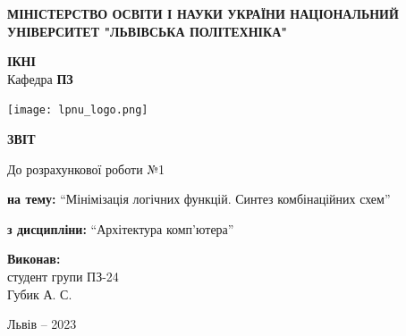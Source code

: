 \documentclass[12pt]{extarticle}
\begin{document}
\begin{titlepage}
    \begin{center}
        \textbf{\normalsize{\MakeUppercase{
            Міністерство Освіти і науки України
            Національний університет "Львівська політехніка"
        }}}

        \begin{flushright}
        \textbf{ІКНІ}\\
        Кафедра \textbf{ПЗ}
        \end{flushright}
        \vspace{15mm}

        \texttt{[image: lpnu\_logo.png]}

        \vspace*{\fill}

        \textbf{\normalsize{\MakeUppercase{Звіт}}}
            
        До розрахункової роботи №1

        \textbf{на тему:} “Мінімізація логічних функцій. Синтез комбінаційних схем”

        \textbf{з дисципліни:} “Архітектура комп’ютера”
            
        \vspace*{\fill}

        \begin{flushright}


            \textbf{Виконав:}\\
            студент групи ПЗ-24\\
            Губик А. С.\\
            \vspace{12pt}

        \vspace{12pt}
        \end{flushright}

        Львів -- 2023
            
            
    \end{center}
\end{titlepage}
\end{document}

